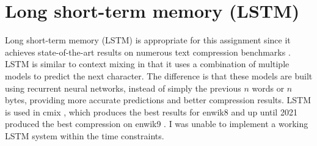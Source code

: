 \documentclass[a4paper, 11pt]{article}
\numberwithin{equation}{section}
\theoremstyle{plain}
\theoremstyle{definition}
\begin{document}
\section{Long short-term memory (LSTM)}
Long short-term memory (LSTM) is appropriate for this assignment since it achieves state-of-the-art 
results on numerous text compression benchmarks \cite{cmix,TextBenchmark}. 
LSTM is similar to context mixing in that it uses a combination of multiple models to predict the next character. 
The difference is that these models are built using recurrent neural networks, instead of 
simply the previous $n$ words or $n$ bytes, providing more accurate predictions and better compression results. 
LSTM is used in cmix \cite{cmix}, which produces the best results for enwik8 and up until 2021 \cite{bellard2021lossless} 
produced the best compression on enwik9 \cite{TextBenchmark}. 
I was unable to implement a working LSTM system within the time constraints. 




\end{document}
